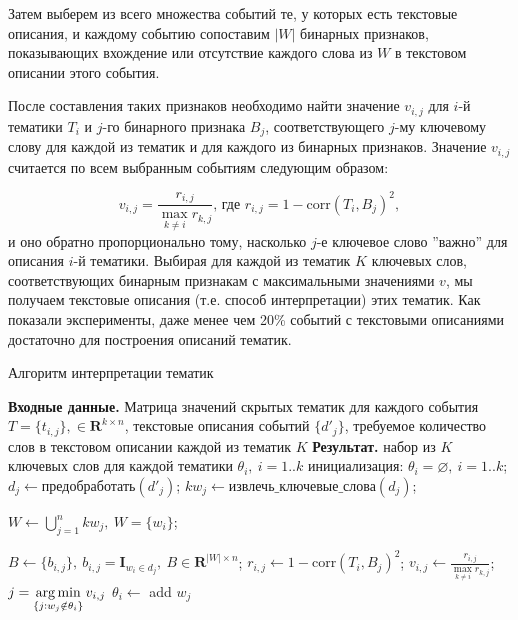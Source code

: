Затем выберем из всего множества событий те, у которых есть текстовые описания, и каждому событию сопоставим $|W|$ бинарных признаков, показывающих вхождение или отсутствие каждого слова из $W$ в текстовом описании этого события.

После составления таких признаков необходимо найти значение $v_{i,j}$ для $i$-й тематики $T_i$ и $j$-го бинарного признака $B_j$, соответствующего $j$-му ключевому слову для каждой из тематик и для каждого из бинарных признаков. Значение $v_{i,j}$ считается по всем выбранным событиям следующим образом:  

$$
v_{i,j} = \frac{r_{i,j}}{\max\limits_{k \neq i} r_{k,j}}\mbox{, где }
r_{i,j} = 1 - \mbox{corr}(T_i, B_j)^2,$$ 
и оно обратно пропорционально тому, насколько $j$-е ключевое слово ''важно'' для описания $i$-й тематики. Выбирая для каждой из тематик $K$ ключевых слов, соответствующих бинарным признакам с максимальными значениями $v$, мы получаем текстовые описания (т.е. способ интерпретации) этих тематик.
Как показали эксперименты, даже менее чем 20\% событий с текстовыми описаниями достаточно для построения описаний тематик. 

\begin{algorithm}
    \caption{Алгоритм интерпретации тематик}\label{alg:kw_interp}
    \begin{algorithmic}
    \STATE \textbf{Входные данные.} Матрица значений скрытых тематик для каждого события $T = \{t_{i,j}\}, \in \mathbf{R}^{k \times n}$, текстовые описания событий $\{d'_j\}$, требуемое количество слов в текстовом описании каждой из тематик $K$
    \STATE \textbf{Результат.} набор из $K$ ключевых слов для каждой тематики $\theta_i,\ i=1..k$
    \STATE инициализация: $\theta_i = \varnothing,\ i=1..k$;
        \STATE $d_j \gets \mbox{предобработать}(d'_j)$;
        \STATE $kw_j \gets \mbox{извлечь\_ключевые\_слова}(d_j)$;
    \ENDFOR
    \item $W \gets \bigcup\limits_{j=1}^n kw_j, \ W=\{w_i\}$;
    \item $B \gets \{b_{i,j}\},\ b_{i,j} = \mathbf{I}_{w_i \in d_j},\ B \in \mathbf{R}^{|W| \times n}$;
            \STATE $r_{i,j} \gets 1 - \mbox{corr}(T_i, B_j)^2$;
            \STATE $v_{i,j} \gets \frac{r_{i,j}}{\max\limits_{k \neq i} r_{k,j}}$;
        \ENDFOR
    \ENDFOR
        \STATE $j=\operatorname*{arg\,min}\limits_{\{j: w_j \notin \theta_i\}} v_{i,j}$\;
        \STATE $\theta_i \gets$ add $w_j$\;
    \ENDFOR
    \end{algorithmic}
\end{algorithm}



